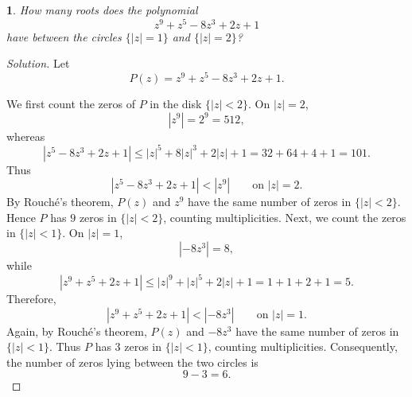 \documentclass[12pt, a4paper]{report}
\theoremstyle{spaced}
\newtheorem{exercise}{}
\begin{document}
\begin{exercise}
	How many roots does the polynomial
	\[
		z^9+z^5-8z^3+2z+1
	\]
	have between the circles \(\{|z|=1\}\) and \(\{|z|=2\}\)?
\end{exercise}
\begin{proof}[Solution]
	Let
	\[
		P(z)=z^9+z^5-8z^3+2z+1.
	\]

	We first count the zeros of \(P\) in the disk \(\{|z|<2\}\). On
	\(|z|=2\),
	\[
		|z^9|=2^9=512,
	\]
	whereas
	\[
		|z^5-8z^3+2z+1|
		\leq |z|^5+8|z|^3+2|z|+1
		=32+64+4+1=101.
	\]
	Thus
	\[
		|z^5-8z^3+2z+1|<|z^9|
		\qquad\text{on } |z|=2.
	\]
	By Rouché's theorem, \(P(z)\) and \(z^9\) have the same number of
	zeros in \(\{|z|<2\}\). Hence \(P\) has \(9\) zeros in \(\{|z|<2\}\),
	counting multiplicities.
	Next, we count the zeros in \(\{|z|<1\}\). On \(|z|=1\),
	\[
		|-8z^3|=8,
	\]
	while
	\[
		|z^9+z^5+2z+1|
		\leq |z|^9+|z|^5+2|z|+1
		=1+1+2+1=5.
	\]
	Therefore,
	\[
		|z^9+z^5+2z+1|<|-8z^3|
		\qquad\text{on } |z|=1.
	\]
	Again, by Rouché's theorem, \(P(z)\) and \(-8z^3\) have the same
	number of zeros in \(\{|z|<1\}\). Thus \(P\) has \(3\) zeros in
	\(\{|z|<1\}\), counting multiplicities.
	Consequently, the number of zeros lying between the two circles is
	\[
		9-3=6.
	\]
\end{proof}
\end{document}
